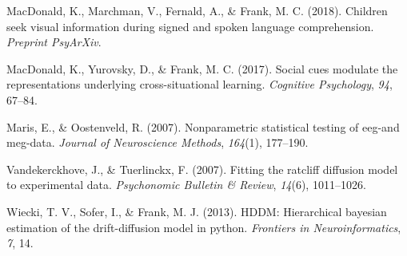 \documentclass[man,floatsintext]{apa6}
\theoremstyle{definition}
\theoremstyle{definition}
\theoremstyle{definition}
\theoremstyle{remark}
\begin{document}
\hypertarget{ref-macdonald2018speed}{}
MacDonald, K., Marchman, V., Fernald, A., \& Frank, M. C. (2018).
Children seek visual information during signed and spoken language
comprehension. \emph{Preprint PsyArXiv}.

\hypertarget{ref-macdonald2017social}{}
MacDonald, K., Yurovsky, D., \& Frank, M. C. (2017). Social cues
modulate the representations underlying cross-situational learning.
\emph{Cognitive Psychology}, \emph{94}, 67--84.

\hypertarget{ref-maris2007nonparametric}{}
Maris, E., \& Oostenveld, R. (2007). Nonparametric statistical testing
of eeg-and meg-data. \emph{Journal of Neuroscience Methods},
\emph{164}(1), 177--190.

\hypertarget{ref-vandekerckhove2007fitting}{}
Vandekerckhove, J., \& Tuerlinckx, F. (2007). Fitting the ratcliff
diffusion model to experimental data. \emph{Psychonomic Bulletin \&
Review}, \emph{14}(6), 1011--1026.

\hypertarget{ref-wiecki2013hddm}{}
Wiecki, T. V., Sofer, I., \& Frank, M. J. (2013). HDDM: Hierarchical
bayesian estimation of the drift-diffusion model in python.
\emph{Frontiers in Neuroinformatics}, \emph{7}, 14.

\endgroup
\end{document}
